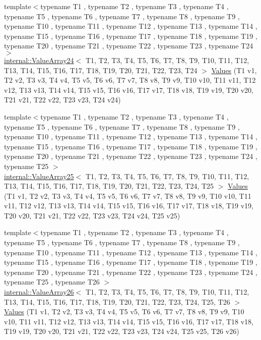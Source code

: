 \begin{DoxyCompactItemize}
\item 
{\footnotesize template$<$typename T1 , typename T2 , typename T3 , typename T4 , typename T5 , typename T6 , typename T7 , typename T8 , typename T9 , typename T10 , typename T11 , typename T12 , typename T13 , typename T14 , typename T15 , typename T16 , typename T17 , typename T18 , typename T19 , typename T20 , typename T21 , typename T22 , typename T23 , typename T24 $>$ }\\\mbox{\hyperlink{classtesting_1_1internal_1_1_value_array24}{internal\+::\+Value\+Array24}}$<$ T1, T2, T3, T4, T5, T6, T7, T8, T9, T10, T11, T12, T13, T14, T15, T16, T17, T18, T19, T20, T21, T22, T23, T24 $>$ \mbox{\hyperlink{namespacetesting_a74b2375fe8c3c685e6f7b0b6a9b61009}{Values}} (T1 v1, T2 v2, T3 v3, T4 v4, T5 v5, T6 v6, T7 v7, T8 v8, T9 v9, T10 v10, T11 v11, T12 v12, T13 v13, T14 v14, T15 v15, T16 v16, T17 v17, T18 v18, T19 v19, T20 v20, T21 v21, T22 v22, T23 v23, T24 v24)
\item 
{\footnotesize template$<$typename T1 , typename T2 , typename T3 , typename T4 , typename T5 , typename T6 , typename T7 , typename T8 , typename T9 , typename T10 , typename T11 , typename T12 , typename T13 , typename T14 , typename T15 , typename T16 , typename T17 , typename T18 , typename T19 , typename T20 , typename T21 , typename T22 , typename T23 , typename T24 , typename T25 $>$ }\\\mbox{\hyperlink{classtesting_1_1internal_1_1_value_array25}{internal\+::\+Value\+Array25}}$<$ T1, T2, T3, T4, T5, T6, T7, T8, T9, T10, T11, T12, T13, T14, T15, T16, T17, T18, T19, T20, T21, T22, T23, T24, T25 $>$ \mbox{\hyperlink{namespacetesting_a74baf6524bda9b5799e313541b4816ea}{Values}} (T1 v1, T2 v2, T3 v3, T4 v4, T5 v5, T6 v6, T7 v7, T8 v8, T9 v9, T10 v10, T11 v11, T12 v12, T13 v13, T14 v14, T15 v15, T16 v16, T17 v17, T18 v18, T19 v19, T20 v20, T21 v21, T22 v22, T23 v23, T24 v24, T25 v25)
\item 
{\footnotesize template$<$typename T1 , typename T2 , typename T3 , typename T4 , typename T5 , typename T6 , typename T7 , typename T8 , typename T9 , typename T10 , typename T11 , typename T12 , typename T13 , typename T14 , typename T15 , typename T16 , typename T17 , typename T18 , typename T19 , typename T20 , typename T21 , typename T22 , typename T23 , typename T24 , typename T25 , typename T26 $>$ }\\\mbox{\hyperlink{classtesting_1_1internal_1_1_value_array26}{internal\+::\+Value\+Array26}}$<$ T1, T2, T3, T4, T5, T6, T7, T8, T9, T10, T11, T12, T13, T14, T15, T16, T17, T18, T19, T20, T21, T22, T23, T24, T25, T26 $>$ \mbox{\hyperlink{namespacetesting_aeca27a322529e5bbd6331e40c810a123}{Values}} (T1 v1, T2 v2, T3 v3, T4 v4, T5 v5, T6 v6, T7 v7, T8 v8, T9 v9, T10 v10, T11 v11, T12 v12, T13 v13, T14 v14, T15 v15, T16 v16, T17 v17, T18 v18, T19 v19, T20 v20, T21 v21, T22 v22, T23 v23, T24 v24, T25 v25, T26 v26)

\end{DoxyCompactItemize}
